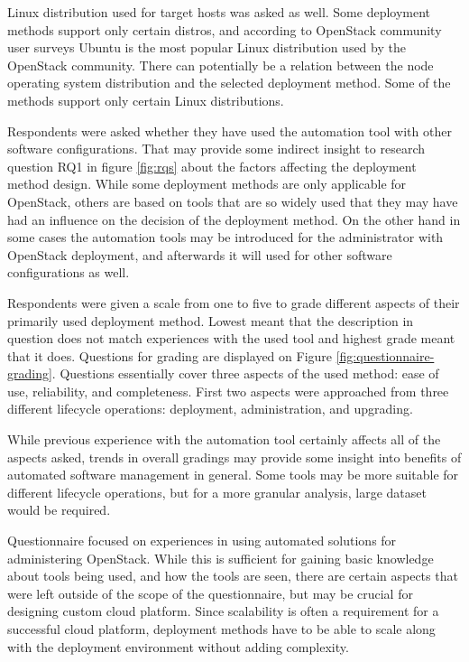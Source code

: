 \documentclass[officiallayout]{tktla}
\begin{document}
Linux distribution used for target hosts was asked as well. Some deployment
methods support only certain distros, and according to OpenStack community user
surveys \cite{openstack-user-survey-2018} Ubuntu is the most popular Linux
distribution used by the OpenStack community. There can potentially be a
relation between the node operating system distribution and the selected
deployment method. Some of the methods support only certain Linux
distributions.

Respondents were asked whether they have used the automation tool with other
software configurations. That may provide some indirect insight to research
question RQ1 in figure \ref{fig:rqs} about the factors affecting the deployment
method design. While some deployment methods are only applicable for OpenStack,
others are based on tools that are so widely used that they may have had an
influence on the decision of the deployment method. On the other hand in some
cases the automation tools may be introduced for the administrator with
OpenStack deployment, and afterwards it will used for other software
configurations as well.

Respondents were given a scale from one to five to grade different aspects of
their primarily used deployment method. Lowest meant that the description in
question does not match experiences with the used tool and highest grade meant
that it does. Questions for grading are displayed on Figure
\ref{fig:questionnaire-grading}. Questions essentially cover three aspects of
the used method: ease of use, reliability, and completeness. First two aspects
were approached from three different lifecycle operations: deployment,
administration, and upgrading.

While previous experience with the automation tool certainly affects all of the
aspects asked, trends in overall gradings may provide some insight into
benefits of automated software management in general. Some tools may be more
suitable for different lifecycle operations, but for a more granular analysis,
large dataset would be required.

Questionnaire focused on experiences in using automated solutions for
administering OpenStack. While this is sufficient for gaining basic knowledge
about tools being used, and how the tools are seen, there are certain aspects
that were left outside of the scope of the questionnaire, but may be crucial
for designing custom cloud platform. Since scalability is often a requirement
for a successful cloud platform, deployment methods have to be able to scale
along with the deployment environment without adding complexity.
\end{document}
